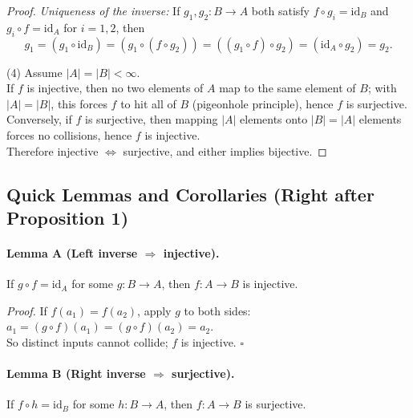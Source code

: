 \documentclass[12pt]{article}
\theoremstyle{definition}
\begin{document}
\begin{proof}
\noindent
\emph{Uniqueness of the inverse:} If \(g_1, g_2 : B\to A\) both satisfy
\(f\circ g_i=\mathrm{id}_B\) and \(g_i\circ f=\mathrm{id}_A\) for \(i=1,2\), then
\[
g_1=(g_1\circ \mathrm{id}_B)=(g_1\circ (f\circ g_2))=((g_1\circ f)\circ g_2)=(\mathrm{id}_A\circ g_2)=g_2.
\]

\dotfill

(4) Assume \(|A|=|B|<\infty\). \\

\noindent
If \(f\) is injective, then no two elements of \(A\) map to the same element of \(B\); with \(|A|=|B|\), this forces \(f\) to hit all of \(B\) (pigeonhole principle), hence \(f\) is surjective.\\

\noindent
Conversely, if \(f\) is surjective, then mapping \(|A|\) elements onto \(|B|=|A|\) elements forces no collisions, hence \(f\) is injective.\\

\noindent
Therefore injective \(\Leftrightarrow\) surjective, and either implies bijective.
\end{proof}

\newpage

\subsection*{Quick Lemmas and Corollaries (Right after Proposition 1)}

\paragraph{\textbf{Lemma A (Left inverse $\Rightarrow$ injective).}}
If \(g\circ f=\mathrm{id}_A\) for some \(g:B\to A\), then \(f:A\to B\) is injective.

\emph{Proof.} If \(f(a_1)=f(a_2)\), apply \(g\) to both sides:
\(a_1=(g\circ f)(a_1)=(g\circ f)(a_2)=a_2\).\\

So distinct inputs cannot collide; \(f\) is injective. \(\square\)

\dotfill

\paragraph{\textbf{Lemma B (Right inverse $\Rightarrow$ surjective).}}
If \(f\circ h=\mathrm{id}_B\) for some \(h:B\to A\), then \(f:A\to B\) is surjective.\\
\end{document}
